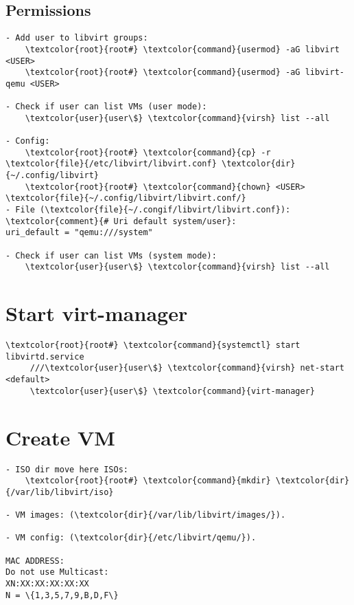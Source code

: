 \documentclass[10pt, a4paper, onecolumn, openany]{book} %
\begin{document}
\subsection{Permissions}
\begin{Verbatim}[commandchars=\\\{\}]
- Add user to libvirt groups:
    \textcolor{root}{root#} \textcolor{command}{usermod} -aG libvirt <USER>
    \textcolor{root}{root#} \textcolor{command}{usermod} -aG libvirt-qemu <USER>

- Check if user can list VMs (user mode):
    \textcolor{user}{user\$} \textcolor{command}{virsh} list --all

- Config:
    \textcolor{root}{root#} \textcolor{command}{cp} -r \textcolor{file}{/etc/libvirt/libvirt.conf} \textcolor{dir}{~/.config/libvirt}
    \textcolor{root}{root#} \textcolor{command}{chown} <USER> \textcolor{file}{~/.config/libvirt/libvirt.conf/}
- File (\textcolor{file}{~/.congif/libvirt/libvirt.conf}):
\textcolor{comment}{# Uri default system/user}:
uri_default = "qemu:///system"

- Check if user can list VMs (system mode):
    \textcolor{user}{user\$} \textcolor{command}{virsh} list --all
\end{Verbatim}

\section{Start virt-manager}
\begin{Verbatim}[commandchars=\\\{\}]
     \textcolor{root}{root#} \textcolor{command}{systemctl} start libvirtd.service
     ///\textcolor{user}{user\$} \textcolor{command}{virsh} net-start <default>
     \textcolor{user}{user\$} \textcolor{command}{virt-manager}
\end{Verbatim}

\section{Create VM}
\begin{Verbatim}[commandchars=\\\{\}]
- ISO dir move here ISOs:
    \textcolor{root}{root#} \textcolor{command}{mkdir} \textcolor{dir}{/var/lib/libvirt/iso}

- VM images: (\textcolor{dir}{/var/lib/libvirt/images/}).

- VM config: (\textcolor{dir}{/etc/libvirt/qemu/}).

MAC ADDRESS:
Do not use Multicast:
XN:XX:XX:XX:XX:XX
N = \{1,3,5,7,9,B,D,F\}
\end{Verbatim}
\end{document}
